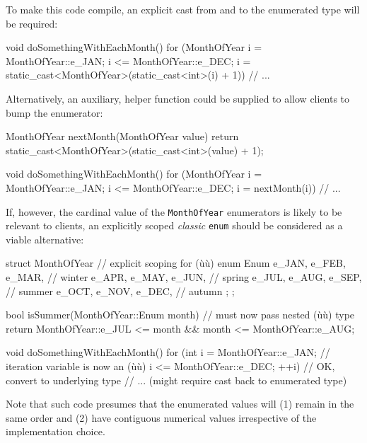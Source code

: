\noindent To make this code compile, an explicit cast from and to the enumerated
type will be required:

\begin{emcppslisting}[emcppsbatch=e15]
void doSomethingWithEachMonth()
{
    for (MonthOfYear i =  MonthOfYear::e_JAN;
                     i <= MonthOfYear::e_DEC;
                     i = static_cast<MonthOfYear>(static_cast<int>(i) + 1))
    {
        // ...
    }
}
\end{emcppslisting}

\noindent Alternatively, an auxiliary, helper function could be supplied to allow
clients to bump the enumerator:

\begin{emcppslisting}[emcppsbatch=e16]
MonthOfYear nextMonth(MonthOfYear value)
{
    return static_cast<MonthOfYear>(static_cast<int>(value) + 1);
}

void doSomethingWithEachMonth()
{
    for (MonthOfYear i =  MonthOfYear::e_JAN;
                     i <= MonthOfYear::e_DEC;
                     i = nextMonth(i))
    {
        // ...
    }
}
\end{emcppslisting}

\noindent If, however, the cardinal value of the \texttt{MonthOfYear} enumerators
is likely to be relevant to clients, an explicitly scoped \emph{classic}
\texttt{enum} should be considered as a viable alternative:

\begin{emcppslisting}
struct MonthOfYear  // explicit scoping for (ù{}ù)
{
    enum Enum
    {
        e_JAN, e_FEB, e_MAR,  // winter
        e_APR, e_MAY, e_JUN,  // spring
        e_JUL, e_AUG, e_SEP,  // summer
        e_OCT, e_NOV, e_DEC,  // autumn
    };
};

bool isSummer(MonthOfYear::Enum month)  // must now pass nested (ù{}ù) type
{
    return MonthOfYear::e_JUL <= month && month <= MonthOfYear::e_AUG;
}

void doSomethingWithEachMonth()
{
    for (int i =  MonthOfYear::e_JAN;  // iteration variable is now an (ù{}ù)
             i <= MonthOfYear::e_DEC;
           ++i)  // OK, convert to underlying type
    {
        // ... (might require cast back to enumerated type)
    }
}
\end{emcppslisting}

\noindent Note that such code presumes that the enumerated values will (1) remain
in the same order and (2) have contiguous numerical values irrespective
of the implementation choice.

